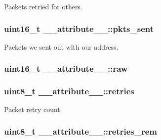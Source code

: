 Packets retried for others. 

\subsubsection[{\texorpdfstring{pkts\+\_\+sent}{pkts_sent}}]{\setlength{\rightskip}{0pt plus 5cm}uint16\+\_\+t \+\_\+\+\_\+attribute\+\_\+\+\_\+\+::pkts\+\_\+sent}\hypertarget{struct____attribute_____a1cfd2d5a79aed9120f40669b04e6f649}{}\label{struct____attribute_____a1cfd2d5a79aed9120f40669b04e6f649}


Packets we sent out with our address. 

\subsubsection[{\texorpdfstring{raw}{raw}}]{\setlength{\rightskip}{0pt plus 5cm}uint16\+\_\+t \+\_\+\+\_\+attribute\+\_\+\+\_\+\+::raw}\hypertarget{struct____attribute_____a6002c78ca3d2dd7e495cb96babc3c2f6}{}\label{struct____attribute_____a6002c78ca3d2dd7e495cb96babc3c2f6}
\subsubsection[{\texorpdfstring{retries}{retries}}]{\setlength{\rightskip}{0pt plus 5cm}uint8\+\_\+t \+\_\+\+\_\+attribute\+\_\+\+\_\+\+::retries}\hypertarget{struct____attribute_____a70bb4d640fb24d470e94698c04440d1e}{}\label{struct____attribute_____a70bb4d640fb24d470e94698c04440d1e}


Packet retry count. 

\subsubsection[{\texorpdfstring{retries\+\_\+rem}{retries_rem}}]{\setlength{\rightskip}{0pt plus 5cm}uint8\+\_\+t \+\_\+\+\_\+attribute\+\_\+\+\_\+\+::retries\+\_\+rem}\hypertarget{struct____attribute_____aebb84f16b4d46a3b2ea267e8b77c8774}{}\label{struct____attribute_____aebb84f16b4d46a3b2ea267e8b77c8774}


